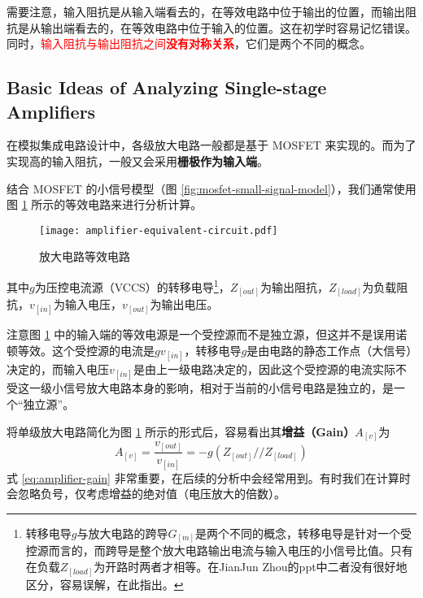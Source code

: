 需要注意，输入阻抗是从输入端看去的，在等效电路中位于输出的位置，而输出阻抗是从输出端看去的，在等效电路中位于输入的位置。这在初学时容易记忆错误。
同时，\textcolor{red}{输入阻抗与输出阻抗之间\textbf{没有对称关系}}，它们是两个不同的概念。

\subsection{Basic Ideas of Analyzing Single-stage Amplifiers}
在模拟集成电路设计中，各级放大电路一般都是基于 MOSFET 来实现的。而为了实现高的输入阻抗，一般又会采用\textbf{栅极作为输入端}。

结合 MOSFET 的小信号模型（图 \ref{fig:mosfet-small-signal-model}），我们通常使用图 \ref{fig:amplifier-equivalent-circuit} 所示的等效电路来进行分析计算。
\begin{figure}[h!tb]
    \centering
    \texttt{[image: amplifier-equivalent-circuit.pdf]}
    \caption{放大电路等效电路}
    \label{fig:amplifier-equivalent-circuit}
\end{figure}
其中$g$为压控电流源（VCCS）的转移电导\footnote{转移电导$g$与放大电路的跨导$G_[m]$是两个不同的概念，转移电导是针对一个受控源而言的，而跨导是整个放大电路输出电流与输入电压的小信号比值。只有在负载$Z_[load]$为开路时两者才相等。在JianJun Zhou的ppt中二者没有很好地区分，容易误解，在此指出。}，$Z_[out]$为输出阻抗，$Z_[load]$为负载阻抗，$v_[in]$为输入电压，$v_[out]$为输出电压。

注意图 \ref{fig:amplifier-equivalent-circuit} 中的输入端的等效电源是一个受控源而不是独立源，但这并不是误用诺顿等效。这个受控源的电流是$g v_[in]$，转移电导$g$是由电路的静态工作点（大信号）决定的，而输入电压$v_[in]$是由上一级电路决定的，因此这个受控源的电流实际不受这一级小信号放大电路本身的影响，相对于当前的小信号电路是独立的，是一个“独立源”。

将单级放大电路简化为图 \ref{fig:amplifier-equivalent-circuit} 所示的形式后，容易看出其\textbf{增益（Gain）$A_[v]$}为
\begin{equation}
    A_[v] = \frac{v_[out]}{v_[in]} = -g (Z_[out] // Z_[load])
    \label{eq:amplifier-gain}
\end{equation}
式 \ref{eq:amplifier-gain} 非常重要，在后续的分析中会经常用到。有时我们在计算时会忽略负号，仅考虑增益的绝对值（电压放大的倍数）。

